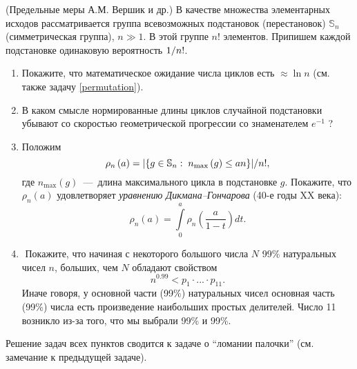 \begin{problem}(Предельные меры А.М. Вершик и др.) 
\label{permutation1}
В качестве множества элементарных исходов рассматривается группа всевозможных 
подстановок (перестановок) $\mathbb{S}_n $ (симметрическая группа), $n\gg 1$. В этой 
группе $n!$ элементов. Припишем каждой подстановке одинаковую вероятность $1 
\mathord{\left/ {\vphantom {1 {n!}}} \right. \kern-\nulldelimiterspace} 
{n!}$.

\begin{enumerate}

\item Покажите, что математическое ожидание числа циклов есть $\approx 
\ln n$ (см. также задачу \ref{permutation}).

\item\Star В каком смысле нормированные длины циклов случайной подстановки 
убывают со скоростью геометрической прогрессии со знаменателем $e^{-1}$ ?

\item\Star Положим $$\rho _n \left( a \right)={\left| {\left\{ {g\in \mathbb{S}_n:\;n_{\max } \left( g \right)\le an} \right\}} \right|} \mathord{\left/ 
{\vphantom {{\left| {\left\{ {g\in S_n :\;n_{\max } \left( g \right)\le an} 
\right\}} \right|} {n!}}} \right. \kern-\nulldelimiterspace} {n!},$$ где 
\mbox{$n_{\max } \left( g \right)$~--- длина} максимального цикла в подстановке $g$. 
Покажите, что $\rho _n \left( a \right)$ удовлетворяет \textit{уравнению Дикмана--Гончарова} (40-е годы XX 
века):
\[
\rho _n \left( a \right)=\int\limits_0^a {\rho _n \left( {\frac{a}{1-t}} 
\right)dt}.
\]
\item\Star\,\,\Star Покажите, что начиная с некоторого большого числа $N$ 99{\%} 
натуральных чисел $n$, больших, чем $N$ обладают свойством
\[
n^{0.99}<p_1 \cdot ...\cdot p_{11} .
\]
Иначе говоря, у основной части (99{\%}) натуральных чисел основная часть 
(99{\%}) числа есть произведение наибольших простых делителей. Число 11 
возникло из-за того, что мы выбрали 99{\%} и 99{\%}.
\end{enumerate}
\end{problem}
\begin{ordre} Решение задач всех пунктов сводится к задаче о ``ломании палочки'' (см. замечание  к предыдущей задаче).
\end{ordre}

